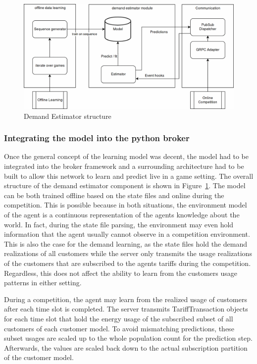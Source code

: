 \begin{figure}[h]
    \centering
    \includegraphics[width=1.0\linewidth]{img/UsageEstimator.png}
    \caption{Demand Estimator structure}
    \label{fig:DemandEstimator}
\end{figure}

\subsubsection{Integrating the model into the python broker}%
\label{sub:integrating_the_model_into_the_python_broker}

Once the general concept of the learning model was decent, the model had to be integrated into the broker framework and
a surrounding architecture had to be built to allow this network to learn and predict live in a game setting.
The overall structure of the demand estimator component is shown in Figure~\ref{fig:DemandEstimator}. The model can be
both trained offline based on the state files and online during the competition. This is possible because in both
situations, the environment model of the agent is a continuous representation of the agents knowledge about the world.
In fact, during the state file parsing, the environment may even hold information that the agent usually cannot observe
in a competition environment. This is also the case for the demand learning, as the state files hold the demand
realizations of all customers while the server  only transmits the usage realizations of the
customers that are subscribed to the agents tariffs during the competition. Regardless, this does not affect the ability to learn from the
customers usage patterns in either setting.

During a competition, the agent may learn from the realized usage of
customers after each time slot is completed. The server transmits TariffTransaction objects for each time slot that hold
the energy usage of the subscribed subset of all customers of each customer model. To avoid mismatching predictions,
these subset usages are scaled up to the whole population count for the prediction step. Afterwards, the values are
scaled back down to the actual subscription partition of the customer model.

